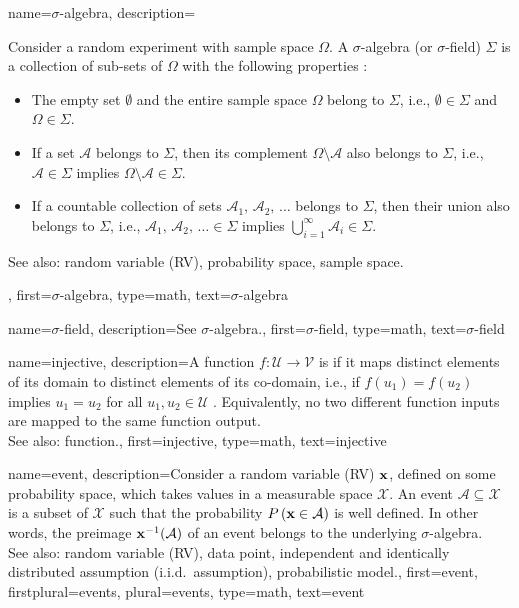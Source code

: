 {
{name={$\sigma$-algebra}, 
	description={Consider a random experiment with sample space $\Omega$. 
		A $\sigma$-algebra (or $\sigma$-field) $\Sigma$ 
		is a collection of sub-sets of $\Omega$ with the following properties 
		\cite{RudinBook,BillingsleyProbMeasure,durrett2010probability}:
		 \begin{itemize}
		 	\item The empty set $\emptyset$ and the entire sample space 
		 	$\Omega$ belong to $\Sigma$, i.e., $\emptyset \in \Sigma$ and $\Omega \in \Sigma$.
		 	\item If a set $\mathcal{A}$ belongs to $\Sigma$, then its complement 
		 	$\Omega \setminus \mathcal{A}$ also belongs to $\Sigma$, i.e., 
		 	$\mathcal{A} \in \Sigma$ implies $\Omega \setminus \mathcal{A} \in \Sigma$.
		 	\item If a countable collection of sets $\mathcal{A}_1, \,\mathcal{A}_2, \,\ldots$ belongs 
			to $\Sigma$, 
		 	then their union also belongs to $\Sigma$, i.e.,
		 	$\mathcal{A}_1, \,\mathcal{A}_2, \,\ldots \in \Sigma$ implies 
		 	$\bigcup_{i=1}^{\infty} \mathcal{A}_i \in \Sigma$.	
		 \end{itemize}			 
		See also: random variable (RV), probability space, sample space.},
	first={$\sigma$-algebra},
	type=math, 
	text={$\sigma$-algebra} 
}

{name={$\sigma$-field}, 
	description={See $\sigma$-algebra.}, 
	first={$\sigma$-field},
	type=math,
	text={$\sigma$-field} 
}


{name={injective}, 
	description={A function $f: \mathcal{U} \rightarrow \mathcal{V}$ is 
	if it maps distinct elements of its domain to distinct elements 
	of its co-domain, 
    i.e., if $f(u_1) = f(u_2)$ implies $u_1 = u_2$ for all $u_1, u_2 \in \mathcal{U}$ 
        \cite{HalmosSet}. 
    Equivalently, no two different function inputs are mapped to the same function output.
				\\
		See also: function.},
	first={injective},
	type=math,
	text={injective} 
}


{name={event}, 
	description={Consider a random variable (RV) ${\bf x}$, defined on some probability space, 
		which takes values in a measurable space $\mathcal{X}$. An 
		event $\mathcal{A} \subseteq \mathcal{X}$ is a subset of $\mathcal{X}$ 
		such that the probability $P\left({\bf x} \in \mathcal{A}\right)$ is well 
		defined. In other words, the preimage ${\bf x}^{-1}(\mathcal{A})$ 
		of an event belongs to the underlying $\sigma$-algebra. 
				\\
		See also: random variable (RV), data point, independent and identically distributed assumption (i.i.d.\ assumption), probabilistic model.},
	first={event},
	firstplural={events},
	plural={events},
	type=math,
	text={event} 
}

}
